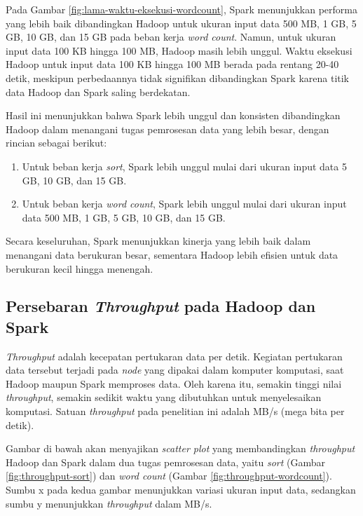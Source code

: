 Pada Gambar \ref{fig:lama-waktu-eksekusi-wordcount}, Spark menunjukkan performa yang lebih baik dibandingkan Hadoop untuk ukuran input data 500 MB, 1 GB, 5 GB, 10 GB, dan 15 GB pada beban kerja \textit{word count}. Namun, untuk ukuran input data 100 KB hingga 100 MB, Hadoop masih lebih unggul. Waktu eksekusi Hadoop untuk input data 100 KB hingga 100 MB berada pada rentang 20-40 detik, meskipun perbedaannya tidak signifikan dibandingkan Spark karena titik data Hadoop dan Spark saling berdekatan.

Hasil ini menunjukkan bahwa Spark lebih unggul dan konsisten dibandingkan Hadoop dalam menangani tugas pemrosesan data yang lebih besar, dengan rincian sebagai berikut:
\begin{enumerate}
\item Untuk beban kerja \textit{sort}, Spark lebih unggul mulai dari ukuran input data 5 GB, 10 GB, dan 15 GB.
\item Untuk beban kerja \textit{word count}, Spark lebih unggul mulai dari ukuran input data 500 MB, 1 GB, 5 GB, 10 GB, dan 15 GB.
\end{enumerate}

Secara keseluruhan, Spark menunjukkan kinerja yang lebih baik dalam menangani data berukuran besar, sementara Hadoop lebih efisien untuk data berukuran kecil hingga menengah.

\subsection {Persebaran \textit{Throughput} pada Hadoop dan Spark}

\textit{Throughput} adalah kecepatan pertukaran data per detik. Kegiatan pertukaran data tersebut terjadi pada \textit{node} yang dipakai dalam komputer komputasi, saat Hadoop maupun Spark memproses data. Oleh karena itu, semakin tinggi nilai \textit{throughput}, semakin sedikit waktu yang dibutuhkan untuk menyelesaikan komputasi. Satuan \textit{throughput} pada penelitian ini adalah MB/s (mega bita per detik).

Gambar di bawah akan menyajikan \textit{scatter plot} yang membandingkan \textit{throughput} Hadoop dan Spark dalam dua tugas pemrosesan data, yaitu \textit{sort} (Gambar \ref{fig:throughput-sort}) dan \textit{word count} (Gambar \ref{fig:throughput-wordcount}). Sumbu x pada kedua gambar menunjukkan variasi ukuran input data, sedangkan sumbu y menunjukkan \textit{throughput} dalam MB/s.

